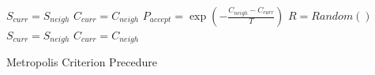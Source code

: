 \setlength{\textfloatsep}{0.2cm}
\begin{algorithm2e}[h]
	{
		$S_{curr}=S_{neigh}$\;
		$C_{curr}=C_{neigh}$\;
	}
	{
		$P_{accept}=\exp{\left( -\frac{C_{neigh}-C_{curr}}{T} \right)}$\;
		$R = Random()$\;
		{
			$S_{curr}=S_{neigh}$\;
			$C_{curr}=C_{neigh}$\;	
		}
	}
	\caption{Metropolis Criterion Precedure}
	\label{algo:metropolis}
\end{algorithm2e}
\setlength{\textfloatsep}{0.2cm}